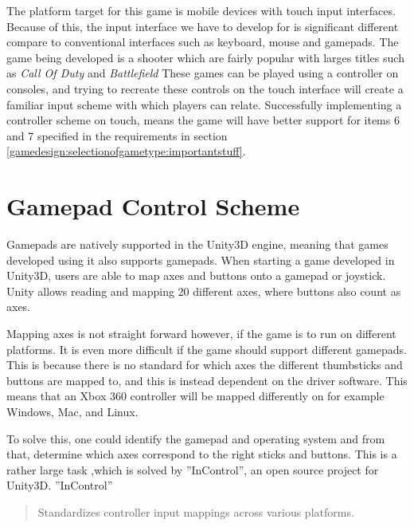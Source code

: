 The platform target for this game is mobile devices with touch input interfaces. Because of this, the input interface we have to develop for is significant different compare to conventional interfaces such as keyboard, mouse and gamepads.
The game being developed is a shooter which are fairly popular with larges titles such as \emph{Call Of Duty} and \emph{Battlefield}
These games can be played using a controller on consoles, and trying to recreate these controls on the touch interface will create a familiar input scheme with which players can relate.
Successfully implementing a controller scheme on touch, means the game will have better support for items 6 and 7 specified in the requirements in section \ref{gamedesign:selectionofgametype:importantstuff}.

\section{Gamepad Control Scheme}
Gamepads are natively supported in the Unity3D engine, meaning that games developed using it also supports gamepads\cite{unity_manual_inputmanager}.
When starting a game developed in Unity3D, users are able to map axes and buttons onto a gamepad or joystick. Unity allows reading and mapping 20 different axes, where buttons also count as axes.

Mapping axes is not straight forward however, if the game is to run on different platforms. It is even more difficult if the game should support different gamepads. This is because there is no standard for which axes the different thumbsticks and buttons are mapped to, and this is instead dependent on the driver software. This means that an Xbox 360 controller will be mapped differently on for example Windows, Mac, and Linux.
\cite{unity_wiki_xbox360controller}

To solve this, one could identify the gamepad and operating system and from that, determine which axes correspond to the right sticks and buttons. This is a rather large task ,which is solved by ''InControl'', an open source project for Unity3D\cite{incontrol_github}. ''InControl'' \begin{quote}Standardizes controller input mappings across various platforms.\cite{incontrol_website}\end{quote}

